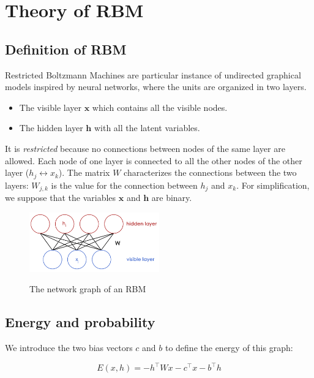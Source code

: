 \documentclass{article}
\begin{document}

\section{Theory of RBM}

\subsection{Definition of RBM}
Restricted Boltzmann Machines are particular instance of undirected graphical models inspired by neural networks, where the units are organized in two layers.

\begin{itemize}
    \item The visible layer $ \mathbf{x} $ which contains all the visible nodes.
    \item The hidden layer $ \mathbf{h} $ with all the latent variables.
\end{itemize}

It is \emph{restricted} because no connections between nodes of the same layer are allowed. Each node of one layer is connected to all the other nodes of the other layer ($h_j \leftrightarrow x_k$). The matrix $W$ characterizes the connections between the two layers: $ W_{j,k} $ is the value for the connection between $h_j$ and $x_k$. For simplification, we suppose that the variables $ \mathbf{x} $ and $ \mathbf{h} $ are binary.

\begin{figure}
\centering
\includegraphics[width=0.5\textwidth]{rbm.png}
\label{fig:RBM}
\caption{The network graph of an RBM}
\end{figure}

\subsection{Energy and probability}
\label{subsec:energy}
We introduce the two bias vectors $c$ and $b$ to define the energy of this graph:

\[ E(x,h) = -h^\top W x - c^\top x - b^\top h \]
\end{document}

